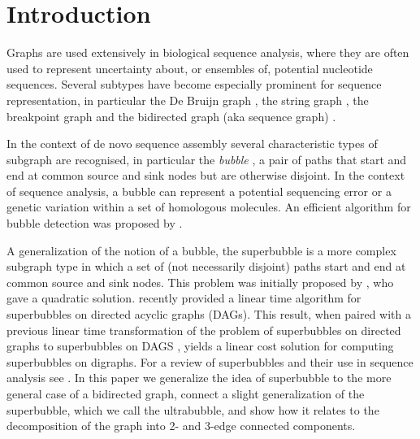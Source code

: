 \documentclass[11pt]{ucthesis}
\begin{document}
 \section{Introduction}




Graphs are used extensively in biological sequence analysis, where they are often used to represent uncertainty about, or ensembles of, potential  nucleotide sequences.  Several subtypes have become especially prominent for sequence representation, in particular the De Bruijn graph \cite{deBruijn:1946va, pevzner2001eulerian}, the string graph \cite{myers2005fragment}, the breakpoint graph \cite{Pevzner:2000tx,Alekseyev:2009dp} and the bidirected graph (aka sequence graph) \cite{Edmonds:2003jq,Medvedev:2009fb}.

 
In the context of de novo sequence assembly several characteristic types of subgraph are recognised, in particular the \emph{bubble} \cite{Zerbino:2008bm}, a pair of paths that start and end at common source and sink nodes but are otherwise disjoint. In the context of sequence analysis, a bubble can represent a potential sequencing error or a genetic variation within a set of homologous molecules. An efficient algorithm for bubble detection was proposed by \cite{Birmele:2012eo}.

A generalization of the notion of a bubble, the superbubble is a more complex subgraph type in which a set of (not necessarily disjoint) paths start and end at common source and sink nodes.  This problem was initially proposed by \cite{Onodera:2013fo}, who gave a quadratic solution.   \cite{Brankovic:2015ez} recently provided a linear time algorithm for superbubbles on directed acyclic graphs (DAGs).  This result, when paired with a previous linear time transformation of the problem of  superbubbles on directed graphs to superbubbles on DAGS \cite{Sung:2015bu}, yields a linear cost solution for computing superbubbles on digraphs. For a review of superbubbles and their use in sequence analysis see \cite{Iliopoulos:2016ej}. In this paper we generalize the idea of superbubble to the more general case of a bidirected graph, connect a slight generalization of the superbubble, which we call the ultrabubble, and show how it relates to the decomposition of the graph into 2- and 3-edge connected components.
\end{document}
